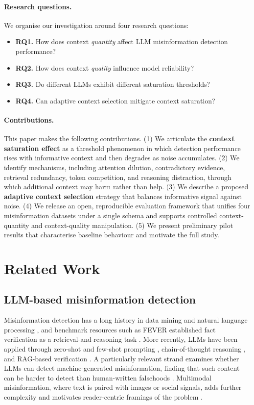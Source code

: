 \documentclass[11pt]{article}
\begin{document}
\paragraph{Research questions.} We organise our investigation around four research questions:
\begin{itemize}
  \item \textbf{RQ1.} How does context \emph{quantity} affect LLM misinformation detection performance?
  \item \textbf{RQ2.} How does context \emph{quality} influence model reliability?
  \item \textbf{RQ3.} Do different LLMs exhibit different saturation thresholds?
  \item \textbf{RQ4.} Can adaptive context selection mitigate context saturation?
\end{itemize}

\paragraph{Contributions.} This paper makes the following contributions. (1) We articulate the \textbf{context saturation effect} as a threshold phenomenon in which detection performance rises with informative context and then degrades as noise accumulates. (2) We identify mechanisms, including attention dilution, contradictory evidence, retrieval redundancy, token competition, and reasoning distraction, through which additional context may harm rather than help. (3) We describe a proposed \textbf{adaptive context selection} strategy that balances informative signal against noise. (4) We release an open, reproducible evaluation framework that unifies four misinformation datasets under a single schema and supports controlled context-quantity and context-quality manipulation. (5) We present preliminary pilot results that characterise baseline behaviour and motivate the full study.

\section{Related Work}
\label{sec:related}

\subsection{LLM-based misinformation detection}
Misinformation detection has a long history in data mining and natural language processing \citep{shu2017survey}, and benchmark resources such as FEVER established fact verification as a retrieval-and-reasoning task \citep{thorne2018fever}. More recently, LLMs have been applied through zero-shot and few-shot prompting \citep{brown2020gpt3}, chain-of-thought reasoning \citep{wei2022cot}, and RAG-based verification \citep{lewis2020rag}. A particularly relevant strand examines whether LLMs can detect machine-generated misinformation, finding that such content can be harder to detect than human-written falsehoods \citep{chen2024llmmisinfo}. Multimodal misinformation, where text is paired with images or social signals, adds further complexity and motivates reader-centric framings of the problem \citep{wang2024readercentric}.
\end{document}
